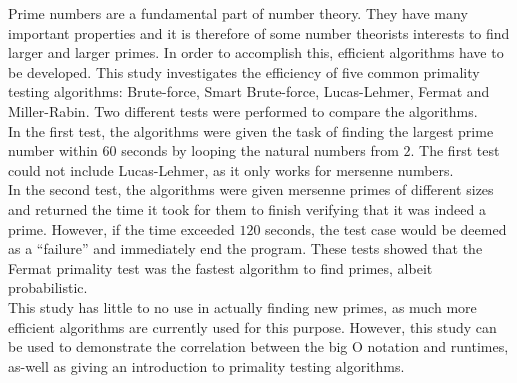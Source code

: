 \documentclass[main.tex]{subfiles}
\begin{document}
Prime numbers are a fundamental part of number theory. They have many important
properties and it is therefore of some number theorists interests to find larger
and larger primes. In order to accomplish this, efficient algorithms have to be
developed. This study investigates the efficiency of five common primality
testing algorithms: Brute-force, Smart Brute-force, Lucas-Lehmer, Fermat and
Miller-Rabin. Two different tests were performed to compare the algorithms. \\

In the first test, the algorithms were given the task of finding the largest
prime number within $60$ seconds by looping the natural numbers from $2$. The
first test could not include Lucas-Lehmer, as it only works for mersenne numbers. \\

In the second test, the algorithms were given mersenne primes of different sizes
and returned the time it took for them to finish verifying that it was indeed a
prime. However, if the time exceeded $120$ seconds, the test case would be
deemed as a ``failure'' and immediately end the program. These tests showed that
the Fermat primality test was the fastest algorithm to find primes, albeit probabilistic. \\

This study has little to no use in actually finding new primes, as much more
efficient algorithms are currently used for this purpose. However, this study
can be used to demonstrate the correlation between the big O notation and
runtimes, as-well as giving an introduction to primality testing algorithms. \\
\end{document}
